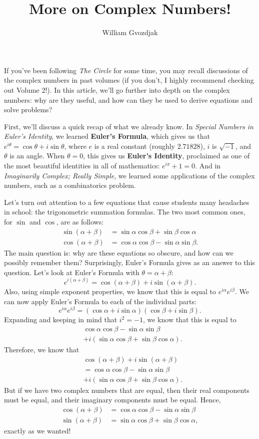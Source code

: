 \documentclass{article}
\title{More on Complex Numbers!}
\author{William Gvozdjak}
\begin{document}
\maketitle
If you've been following \textit{The Circle} for some time, you may recall discussions of the complex numbers in past volumes (if you don't, I highly recommend checking out Volume 2!). In this article, we'll go further into depth on the complex numbers: why are they useful, and how can they be used to derive equations and solve problems?

First, we'll discuss a quick recap of what we already know. In \textit{Special Numbers in Euler's Identity}, we learned \textbf{Euler's Formula}, which gives us that $e^{i\theta}=\cos\theta+i\sin\theta$, where $e$ is a real constant (roughly $2.71828$), $i$ is $\sqrt{-1}$, and $\theta$ is an angle. When $\theta=0$, this gives us \textbf{Euler's Identity}, proclaimed as one of the most beautiful identities in all of mathematics: $e^{i\pi}+1=0$. And in \textit{Imaginarily Complex; Really Simple}, we learned some applications of the complex numbers, such as a combinatorics problem.

Let's turn out attention to a few equations that cause students many headaches in school: the trigonometric summation formulas. The two most common ones, for $\sin$ and $\cos$, are as follows:
\begin{align*}
    \sin(\alpha+\beta)&=\sin\alpha\cos\beta+\sin\beta\cos\alpha \\
    \cos(\alpha+\beta)&=\cos\alpha\cos\beta-\sin\alpha\sin\beta.
\end{align*}
The main question is: why are these equations so obscure, and how can we possibly remember them? Surprisingly, Euler's Formula gives as an answer to this question. Let's look at Euler's Formula with $\theta=\alpha+\beta$:
\[e^{i(\alpha+\beta)}=\cos(\alpha+\beta)+i\sin(\alpha+\beta).\]
Also, using simple exponent properties, we know that this is equal to $e^{i\alpha}e^{i\beta}$. We can now apply Euler's Formula to each of the individual parts:
\[e^{i\alpha}e^{i\beta}=(\cos\alpha+i\sin\alpha)(\cos\beta+i\sin\beta).\]
Expanding and keeping in mind that $i^2=-1$, we know that this is equal to
\begin{align*}
&\cos\alpha\cos\beta-\sin\alpha\sin\beta \\&+i(\sin\alpha\cos\beta+\sin\beta\cos\alpha).
\end{align*}
Therefore, we know that
\begin{align*}
&\cos(\alpha+\beta)+i\sin(\alpha+\beta) \\
&=\cos\alpha\cos\beta-\sin\alpha\sin\beta \\
&+i(\sin\alpha\cos\beta+\sin\beta\cos\alpha).
\end{align*}
But if we have two complex numbers that are equal, then their real components must be equal, and their imaginary components must be equal. Hence,
\begin{align*}
    \cos(\alpha+\beta)&=\cos\alpha\cos\beta-\sin\alpha\sin\beta \\
    \sin(\alpha+\beta)&=\sin\alpha\cos\beta+\sin\beta\cos\alpha,
\end{align*}
exactly as we wanted!
\end{document}
